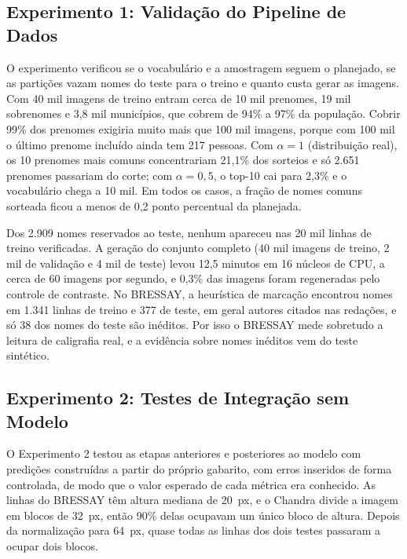 \documentclass[12pt,a4paper]{article}
\begin{document}
\subsection{Experimento 1: Validação do Pipeline de Dados}

O experimento verificou se o vocabulário e a amostragem seguem o planejado, se as partições vazam nomes do teste para o treino e quanto custa gerar as imagens. Com 40 mil imagens de treino entram cerca de 10 mil prenomes, 19 mil sobrenomes e 3,8 mil municípios, que cobrem de 94\% a 97\% da população. Cobrir 99\% dos prenomes exigiria muito mais que 100 mil imagens, porque com 100 mil o último prenome incluído ainda tem 217 pessoas. Com $\alpha = 1$ (distribuição real), os 10 prenomes mais comuns concentrariam 21,1\% dos sorteios e só 2.651 prenomes passariam do corte; com $\alpha = 0{,}5$, o top-10 cai para 2,3\% e o vocabulário chega a 10 mil. Em todos os casos, a fração de nomes comuns sorteada ficou a menos de 0,2 ponto percentual da planejada.


Dos 2.909 nomes reservados ao teste, nenhum apareceu nas 20 mil linhas de treino verificadas. A geração do conjunto completo (40 mil imagens de treino, 2 mil de validação e 4 mil de teste) levou 12,5 minutos em 16 núcleos de CPU, a cerca de 60 imagens por segundo, e 0,3\% das imagens foram regeneradas pelo controle de contraste. No BRESSAY, a heurística de marcação encontrou nomes em 1.341 linhas de treino e 377 de teste, em geral autores citados nas redações, e só 38 dos nomes do teste são inéditos. Por isso o BRESSAY mede sobretudo a leitura de caligrafia real, e a evidência sobre nomes inéditos vem do teste sintético.

\subsection{Experimento 2: Testes de Integração sem Modelo}
\label{subsec:exp2}

O Experimento 2 testou as etapas anteriores e posteriores ao modelo com predições construídas a partir do próprio gabarito, com erros inseridos de forma controlada, de modo que o valor esperado de cada métrica era conhecido. As linhas do BRESSAY têm altura mediana de 20~px, e o Chandra divide a imagem em blocos de 32~px, então 90\% delas ocupavam um único bloco de altura. Depois da normalização para 64~px, quase todas as linhas dos dois testes passaram a ocupar dois blocos.
\end{document}

